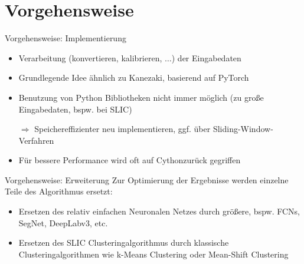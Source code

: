 \documentclass[9pt]{beamer}
\begin{document}
\section{Vorgehensweise}

\begin{frame}{Vorgehensweise: Implementierung}
\begin{itemize}
	\item Verarbeitung (konvertieren, kalibrieren, $\ldots$) der Eingabedaten
	\item Grundlegende Idee ähnlich zu Kanezaki, basierend auf PyTorch
	\item Benutzung von Python Bibliotheken nicht immer möglich (zu große Eingabedaten, bspw. bei SLIC)
	\item[$\Rightarrow$] Speichereffizienter neu implementieren, ggf. über Sliding-Window-Verfahren
	\item Für bessere Performance wird oft auf Cython\footnotemark[1] zurück gegriffen
\end{itemize}
\end{frame}

\begin{frame}{Vorgehensweise: Erweiterung}
Zur Optimierung der Ergebnisse werden einzelne Teile des Algorithmus ersetzt:
\begin{itemize}
	\item Ersetzen des relativ einfachen Neuronalen Netzes durch größere, bspw. FCNs, SegNet\footnotemark[1], DeepLabv3\footnotemark[1], etc.
	\item Ersetzen des SLIC Clusteringalgorithmus durch klassische Clusteringalgorithmen wie k-Means Clustering oder Mean-Shift Clustering
\end{itemize}
\end{frame}
\end{document}
